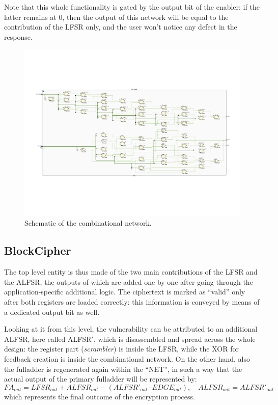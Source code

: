 Note that this whole functionality is gated by the output bit of the enabler: if the latter remains at 0, then the output of this network will be equal to the contribution of the LFSR only, and the user won't notice any defect in the response.
\begin{figure}[!ht]
\vspace{0.5cm}
\includegraphics[width=\textwidth]{images/combinational_network.png}
\caption{Schematic of the combinational network.}
\end{figure}
\subsection{BlockCipher}
The top level entity is thus made of the two main contributions of the LFSR and the ALFSR, the outputs of which are added one by one after going through the application-specific additional logic.
The ciphertext is marked as ``valid'' only after both registers are loaded correctly: this information is conveyed by means of a dedicated output bit as well.

Looking at it from this level, the vulnerability can be attributed to an additional ALFSR, here called ALFSR$'$, which is disassembled and spread across the whole design: the register part (\emph{scrambler}) is inside the LFSR, while the XOR for feedback creation is inside the combinational network.
On the other hand, also the fulladder is regenerated again within the ``NET'', in such a way that the actual output of the primary fulladder will be represented by:
\begin{equation}
FA_{out}=LFSR_{out}+ALFSR_{out}-(ALFSR'_{out}\cdot EDGE_{out}),\quad ALFSR_{out}=ALFSR'_{out}
\end{equation}
which represents the final outcome of the encryption process.

